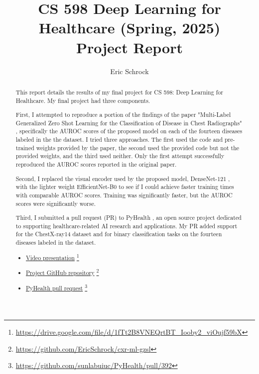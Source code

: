 \documentclass[letterpaper]{article} %
\title{CS 598 Deep Learning for Healthcare (Spring, 2025)\\Project Report}
\author {Eric Schrock}
\begin{document}
\maketitle

\begin{abstract}
This report details the results of my final project for CS 598: Deep Learning for Healthcare. My final project had three components.

First, I attempted to reproduce a portion of the findings of the paper "Multi-Label Generalized Zero Shot Learning for the Classification of Disease in Chest Radiographs" \cite{hayat2021multilabel}, specifically the AUROC scores of the proposed model on each of the fourteen diseases labeled in the the dataset. I tried three approaches. The first used the code and pre-trained weights provided by the paper, the second used the provided code but not the provided weights, and the third used neither. Only the first attempt successfully reproduced the AUROC scores reported in the original paper.

Second, I replaced the visual encoder used by the proposed model, DenseNet-121 \cite{huang2018denselyconnectedconvolutionalnetworks}, with the lighter weight EfficientNet-B0 \cite{tan2020efficientnetrethinkingmodelscaling} to see if I could achieve faster training times with comparable AUROC scores. Training was significantly faster, but the AUROC scores were significantly worse.

Third, I submitted a pull request (PR) to PyHealth \cite{pyhealth2023yang}, an open source project dedicated to supporting healthcare-related AI research and applications. My PR added support for the ChestX-ray14 \cite{Wang_2017} dataset and for binary classification tasks on the fourteen diseases labeled in the dataset.

\begin{itemize}
    \item \href{https://drive.google.com/file/d/1fTt2B8VNEQrtBT_Iooby2_viOujf59bX}{Video presentation} \footnote{\url{https://drive.google.com/file/d/1fTt2B8VNEQrtBT_Iooby2_viOujf59bX}}
    \item \href{https://github.com/EricSchrock/cxr-ml-gzsl}{Project GitHub repository} \footnote{\url{https://github.com/EricSchrock/cxr-ml-gzsl}}
    \item \href{https://github.com/sunlabuiuc/PyHealth/pull/392}{PyHealth pull request} \footnote{\url{https://github.com/sunlabuiuc/PyHealth/pull/392}}
\end{itemize}
\end{abstract}
\end{document}
